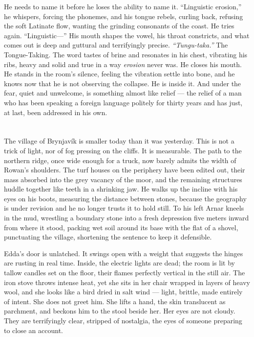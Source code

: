 \documentclass[11pt,oneside]{book}
\begin{document}
He needs to name it before he loses the ability to name it. ``Linguistic
erosion,'' he whispers, forcing the phonemes, and his tongue rebels,
curling back, refusing the soft Latinate flow, wanting the grinding
consonants of the coast. He tries again. ``Linguistic---'' His mouth
shapes the vowel, his throat constricts, and what comes out is deep and
guttural and terrifyingly precise. \emph{``Tungu-taka.''} The
Tongue-Taking. The word tastes of brine and resonates in his chest,
vibrating his ribs, heavy and solid and true in a way \emph{erosion}
never was. He closes his mouth. He stands in the room's silence, feeling
the vibration settle into bone, and he knows now that he is not
observing the collapse. He is inside it. And under the fear, quiet and
unwelcome, is something almost like relief --- the relief of a man who
has been speaking a foreign language politely for thirty years and has
just, at last, been addressed in his own.

\chapter{}

The village of Brynjavík is smaller today than it was yesterday. This is
not a trick of light, nor of fog pressing on the cliffs. It is
measurable. The path to the northern ridge, once wide enough for a
truck, now barely admits the width of Rowan's shoulders. The turf houses
on the periphery have been edited out, their mass absorbed into the grey
vacancy of the moor, and the remaining structures huddle together like
teeth in a shrinking jaw. He walks up the incline with his eyes on his
boots, measuring the distance between stones, because the geography is
under revision and he no longer trusts it to hold still. To his left
Arnar kneels in the mud, wrestling a boundary stone into a fresh
depression five meters inward from where it stood, packing wet soil
around its base with the flat of a shovel, punctuating the village,
shortening the sentence to keep it defensible.

Edda's door is unlatched. It swings open with a weight that suggests the
hinges are rusting in real time. Inside, the electric lights are dead;
the room is lit by tallow candles set on the floor, their flames
perfectly vertical in the still air. The iron stove throws intense heat,
yet she sits in her chair wrapped in layers of heavy wool, and she looks
like a bird dried in salt wind --- light, brittle, made entirely of
intent. She does not greet him. She lifts a hand, the skin translucent
as parchment, and beckons him to the stool beside her. Her eyes are not
cloudy. They are terrifyingly clear, stripped of nostalgia, the eyes of
someone preparing to close an account.
\end{document}
